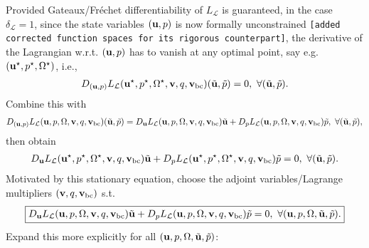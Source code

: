 \documentclass[oneside]{book}
\numberwithin{equation}{section}
\begin{document}
Provided Gateaux/Fr\'echet differentiability of $L_{\mathcal{L}}$ is guaranteed, in the case $\delta_{\mathcal{L}} = 1$, since the state variables $({\bf u},p)$ is now formally unconstrained \texttt{[added corrected function spaces for its rigorous counterpart]}, the derivative of the Lagrangian w.r.t. $({\bf u},p)$ has to vanish at any optimal point, say e.g. $({\bf u}^\star,p^\star,\Omega^\star)$, i.e.,
\begin{align*}
    D_{({\bf u},p)} L_{\mathcal{L}}({\bf u}^\star,p^\star,\Omega^\star,{\bf v},q,{\bf v}_{\rm bc})(\tilde{\bf u},\tilde{p}) = 0,\ \forall(\tilde{\bf u},\tilde{p}).
\end{align*}
Combine this with
\begin{align*}
    D_{({\bf u},p)} L_{\mathcal{L}}({\bf u},p,\Omega,{\bf v},q,{\bf v}_{\rm bc})(\tilde{\bf u},\tilde{p}) = D_{\bf u}L_{\mathcal{L}} ({\bf u},p,\Omega,{\bf v},q,{\bf v}_{\rm bc})\tilde{\bf u} + D_pL_{\mathcal{L}} ({\bf u},p,\Omega,{\bf v},q,{\bf v}_{\rm bc})\tilde{p},\ \forall(\tilde{\bf u},\tilde{p}),
\end{align*}
then obtain
\begin{align*}
    D_{\bf u}L_{\mathcal{L}} ({\bf u}^\star,p^\star,\Omega^\star,{\bf v},q,{\bf v}_{\rm bc})\tilde{\bf u} + D_pL_{\mathcal{L}} ({\bf u}^\star,p^\star,\Omega^\star,{\bf v},q,{\bf v}_{\rm bc})\tilde{p} = 0,\ \forall(\tilde{\bf u},\tilde{p}).
\end{align*}
Motivated by this stationary equation, choose the adjoint variables/Lagrange multipliers $({\bf v},q,{\bf v}_{\rm bc})$ s.t. 
\begin{align*}
    \boxed{D_{\bf u} L_{\mathcal{L}}({\bf u},p,\Omega,{\bf v},q,{\bf v}_{\rm bc})\tilde{\bf u} + D_pL_{\mathcal{L}}({\bf u},p,\Omega,{\bf v},q,{\bf v}_{\rm bc})\tilde{p} = 0,\ \forall({\bf u},p,\Omega,\tilde{\bf u},\tilde{p}).}
\end{align*}
Expand this more explicitly for all $({\bf u},p,\Omega,\tilde{\bf u},\tilde{p})$:
\end{document}
